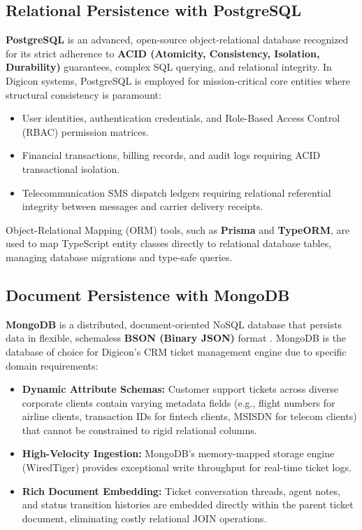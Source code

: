\subsection{Relational Persistence with PostgreSQL}
\textbf{PostgreSQL} is an advanced, open-source object-relational database recognized for its strict adherence to \textbf{ACID (Atomicity, Consistency, Isolation, Durability)} guarantees, complex SQL querying, and relational integrity. In Digicon systems, PostgreSQL is employed for mission-critical core entities where structural consistency is paramount:
\begin{itemize}
    \item User identities, authentication credentials, and Role-Based Access Control (RBAC) permission matrices.
    \item Financial transactions, billing records, and audit logs requiring ACID transactional isolation.
    \item Telecommunication SMS dispatch ledgers requiring relational referential integrity between messages and carrier delivery receipts.
\end{itemize}

Object-Relational Mapping (ORM) tools, such as \textbf{Prisma} and \textbf{TypeORM}, are used to map TypeScript entity classes directly to relational database tables, managing database migrations and type-safe queries.

\subsection{Document Persistence with MongoDB}
\textbf{MongoDB} is a distributed, document-oriented NoSQL database that persists data in flexible, schemaless \textbf{BSON (Binary JSON)} format \citep{chodorow2013mongodb}. MongoDB is the database of choice for Digicon's CRM ticket management engine due to specific domain requirements:
\begin{itemize}
    \item \textbf{Dynamic Attribute Schemas:} Customer support tickets across diverse corporate clients contain varying metadata fields (e.g., flight numbers for airline clients, transaction IDs for fintech clients, MSISDN for telecom clients) that cannot be constrained to rigid relational columns.
    \item \textbf{High-Velocity Ingestion:} MongoDB's memory-mapped storage engine (WiredTiger) provides exceptional write throughput for real-time ticket logs.
    \item \textbf{Rich Document Embedding:} Ticket conversation threads, agent notes, and status transition histories are embedded directly within the parent ticket document, eliminating costly relational JOIN operations.
\end{itemize}

